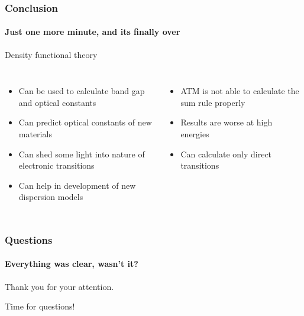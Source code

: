 \documentclass{beamer}
\begin{document}
\begin{frame}
    \frametitle{Conclusion}
    \framesubtitle{Just one more minute, and its finally over}
	\begin{center}Density functional theory\end{center}
	\begin{columns}[c]
	\begin{itemize}
	\item Can be used to calculate band gap and optical constants 

	\item Can predict optical constants of new materials

	\item Can shed some light into nature of electronic transitions

	\item Can help in development of new dispersion models
	\end{itemize}


	\begin{itemize}
	\item ATM is not able to calculate the sum rule properly

	\item Results are worse at high energies

	\item Can calculate only direct transitions

	\end{itemize}
	\end{columns}
\end{frame}

\begin{frame}
    \frametitle{Questions}
    \framesubtitle{Everything was clear, wasn't it?}

	\begin{center}
	Thank you for your attention.
	\end{center}
	\begin{center}
	Time for questions!
	\end{center}

\end{frame}
\end{document}
